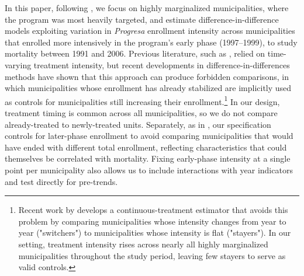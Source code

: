 \documentclass[12pt]{article}
\begin{document}



\p In this paper, following \cite{parker2023conditional}, we focus on highly marginalized municipalities, where the program was most heavily targeted, and estimate difference-in-difference models exploiting variation in \textit{Progresa} enrollment intensity across municipalities that enrolled more intensively in the program's early phase (1997--1999), to study mortality between 1991 and 2006. Previous literature, such as \cite{BarhamRowberry2013JDE}, relied on time-varying treatment intensity, but recent developments in difference-in-differences methods have shown that this approach can produce forbidden comparisons, in which municipalities whose enrollment has already stabilized are implicitly used as controls for municipalities still increasing their enrollment.\footnote{Recent work by \cite{deChaisemartinDHaultfoeuille2024IntertemporalDiD} develops a continuous-treatment estimator that avoids this problem by comparing municipalities whose intensity changes from year to year ("switchers") to municipalities whose intensity is flat ("stayers"). In our setting, treatment intensity rises across nearly all highly marginalized municipalities throughout the study period, leaving few stayers to serve as valid controls.} In our design, treatment timing is common across all municipalities, so we do not compare already-treated to newly-treated units. Separately, as in \citep{parker2023conditional}, our specification controls for later-phase enrollment to avoid comparing municipalities that would have ended with different total enrollment, reflecting characteristics that could themselves be correlated with mortality. Fixing early-phase intensity at a single point per municipality also allows us to include interactions with year indicators and test directly for pre-trends.
\end{document}
